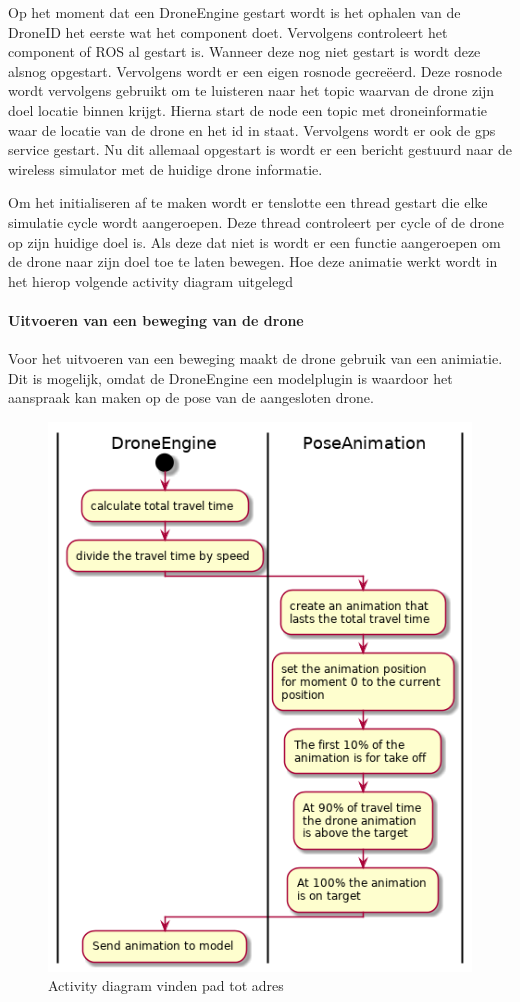 \documentclass[a4paper, 11pt, oneside]{report}
\begin{document}
Op het moment dat een DroneEngine gestart wordt is het ophalen van de DroneID  het eerste wat het component doet.
Vervolgens controleert het component of ROS al gestart is.
Wanneer deze nog niet gestart is wordt deze alsnog opgestart.
Vervolgens wordt er een eigen rosnode gecreëerd.
Deze rosnode wordt vervolgens gebruikt om te luisteren naar het topic waarvan de drone zijn doel locatie binnen krijgt.
Hierna start de node een topic met droneinformatie waar de locatie van de drone en het id in staat.
Vervolgens wordt er ook de gps service gestart.
Nu dit allemaal opgestart is wordt er een bericht gestuurd naar de wireless simulator met de huidige drone informatie.

Om het initialiseren af te maken wordt er tenslotte een thread gestart die elke simulatie cycle wordt aangeroepen.
Deze thread controleert per cycle of de drone op zijn huidige doel is.
Als deze dat niet is wordt er een functie aangeroepen om de drone naar zijn doel toe te laten bewegen.
Hoe deze animatie werkt wordt in het hierop volgende activity diagram uitgelegd   


\paragraph{Uitvoeren van een beweging van de drone}
\label{DetailedDesign:MeshNetwerk:Activity:AnimatieDrone}
Voor het uitvoeren van een beweging maakt de drone gebruik van een animiatie. 
Dit is mogelijk, omdat de DroneEngine een modelplugin is waardoor het aanspraak kan maken op de pose van de aangesloten drone.
  

\begin{figure}[H]
	\begin{center}\includegraphics[width=.45\linewidth]{UML/out/DroneSimulation/Activity/DroneMovement/DroneMovement.png}\end{center}
	\caption{Activity diagram vinden pad tot adres}
	\label{fig:communication:MeshNetwerk:Activity:AnimatieDrone}
\end{figure}
\end{document}
